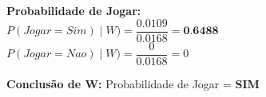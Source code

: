 \documentclass{article}
\begin{document}
  \begin{tabbing}
    \textbf{Probabilidade de Jogar:}\\
    $P(Jogar=Sim) \mid W) = \dfrac{0.0109}{0.0168} = \textbf{0.6488}$ \\
    $P(Jogar=Nao) \mid W) = \dfrac{0}{0.0168} = 0$
  \end{tabbing}

  \begin{tabbing}
    \textbf{Conclusão de W:}
    Probabilidade de Jogar = \textbf{SIM} \\
  \end{tabbing}
\end{document}
